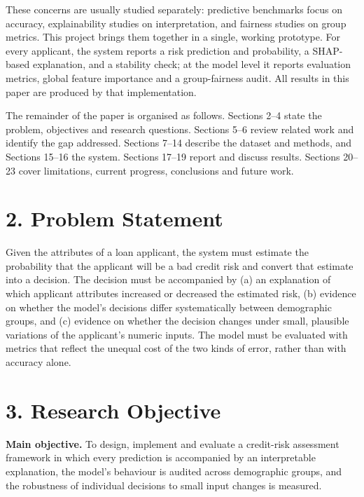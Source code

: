 \documentclass[
  11pt,
]{article}
\begin{document}
These concerns are usually studied separately: predictive benchmarks
focus on accuracy, explainability studies on interpretation, and
fairness studies on group metrics. This project brings them together in
a single, working prototype. For every applicant, the system reports a
risk prediction and probability, a SHAP-based explanation, and a
stability check; at the model level it reports evaluation metrics,
global feature importance and a group-fairness audit. All results in
this paper are produced by that implementation.

The remainder of the paper is organised as follows. Sections 2--4 state
the problem, objectives and research questions. Sections 5--6 review
related work and identify the gap addressed. Sections 7--14 describe the
dataset and methods, and Sections 15--16 the system. Sections 17--19
report and discuss results. Sections 20--23 cover limitations, current
progress, conclusions and future work.

\hypertarget{problem-statement}{%
\section{2. Problem Statement}\label{problem-statement}}

Given the attributes of a loan applicant, the system must estimate the
probability that the applicant will be a bad credit risk and convert
that estimate into a decision. The decision must be accompanied by (a)
an explanation of which applicant attributes increased or decreased the
estimated risk, (b) evidence on whether the model's decisions differ
systematically between demographic groups, and (c) evidence on whether
the decision changes under small, plausible variations of the
applicant's numeric inputs. The model must be evaluated with metrics
that reflect the unequal cost of the two kinds of error, rather than
with accuracy alone.

\hypertarget{research-objective}{%
\section{3. Research Objective}\label{research-objective}}

\textbf{Main objective.} To design, implement and evaluate a credit-risk
assessment framework in which every prediction is accompanied by an
interpretable explanation, the model's behaviour is audited across
demographic groups, and the robustness of individual decisions to small
input changes is measured.
\end{document}
